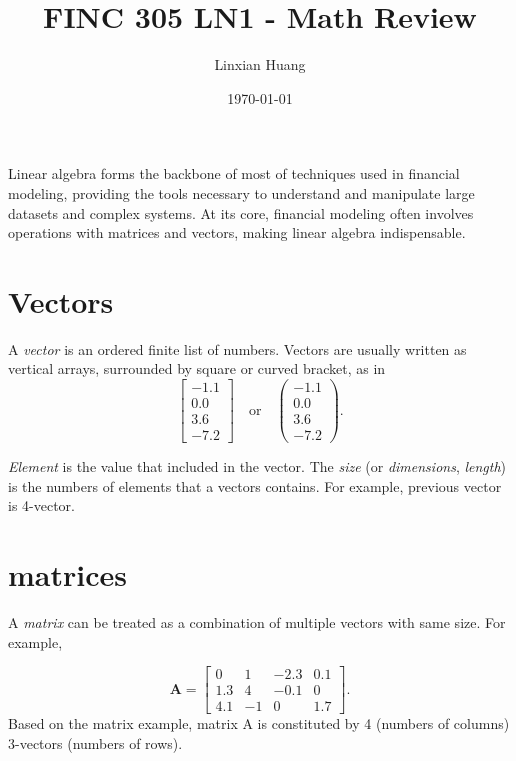 \documentclass[11pt]{article}
\title{FINC 305 LN1 - Math Review}
\author{Linxian Huang}
\date{\today}
\begin{document}
\maketitle
    Linear algebra forms the backbone of most of  techniques used in financial modeling, providing the tools necessary to understand 
    and manipulate large datasets and complex systems. At its core, financial modeling often involves operations with matrices and vectors,
     making linear algebra indispensable. \\

\section{Vectors}

A \textit{vector} is an ordered finite list of numbers. Vectors are usually written as vertical arrays, surrounded by square or curved bracket, 
as in \\

\[
\begin{bmatrix}
-1.1 \\ 
0.0 \\ 
3.6 \\ 
-7.2
\end{bmatrix}
\quad \text{or} \quad
\begin{pmatrix}
-1.1 \\ 
0.0 \\ 
3.6 \\ 
-7.2
\end{pmatrix}.
\]

\textit{Element} is the value that included in the vector. The \textit{size} (or \textit{dimensions}, \textit{length}) is the numbers of elements 
that a vectors contains. For example, previous vector is 4-vector. 


\section{matrices}

A \textit{matrix} can be treated as a combination of multiple vectors with same size. For example, 

\[
\mathbf{A} =
\begin{bmatrix}
0 & 1 & -2.3 & 0.1 \\
1.3 & 4 & -0.1 & 0 \\
4.1 & -1 & 0 & 1.7
\end{bmatrix}.
\]
Based on the matrix example, matrix A is constituted by 4 (numbers of columns) 3-vectors (numbers of rows).  \\
\end{document}
